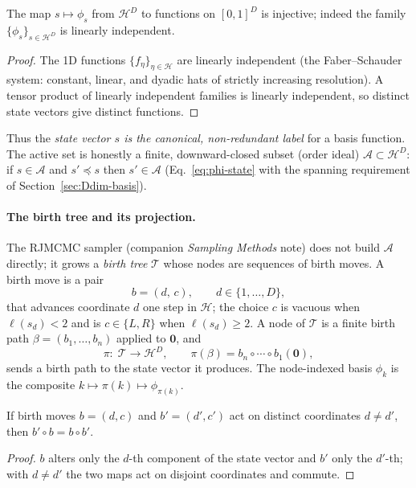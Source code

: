 \documentclass[11pt]{article}
\begin{document}
\begin{proposition}
\label{prop:phi-injective}
The map $s\mapsto\phi_s$ from $\mathcal{H}^D$ to functions on $[0,1]^D$ is
injective; indeed the family $\{\phi_s\}_{s\in\mathcal{H}^D}$ is linearly
independent.
\end{proposition}
\begin{proof}
The 1D functions $\{f_\eta\}_{\eta\in\mathcal{H}}$ are linearly independent
(the Faber--Schauder system: constant, linear, and dyadic hats of strictly
increasing resolution).  A tensor product of linearly independent families is
linearly independent, so distinct state vectors give distinct functions.
\end{proof}

Thus the \emph{state vector $s$ is the canonical, non-redundant label} for a
basis function.  The active set is honestly a finite, downward-closed subset
(order ideal) $\mathcal{A}\subset\mathcal{H}^D$: if $s\in\mathcal{A}$ and
$s'\preceq s$ then $s'\in\mathcal{A}$ (Eq.~\eqref{eq:phi-state} with the
spanning requirement of Section~\ref{sec:Ddim-basis}).

\paragraph{The birth tree and its projection.}
The RJMCMC sampler (companion \emph{Sampling Methods} note) does not build
$\mathcal{A}$ directly; it grows a \emph{birth tree} $\mathcal{T}$ whose nodes
are sequences
of birth moves.  A birth move is a pair
\begin{equation}
  b = (d,\,c),\qquad d\in\{1,\dots,D\},
\end{equation}
that advances coordinate $d$ one step in $\mathcal{H}$; the choice $c$ is vacuous
when $\ell(s_d)<2$ and is $c\in\{L,R\}$ when $\ell(s_d)\ge2$.  A node of
$\mathcal{T}$ is a finite birth path $\beta=(b_1,\dots,b_n)$ applied to
$\mathbf 0$, and
\begin{equation}
  \pi:\;\mathcal{T}\longrightarrow\mathcal{H}^D,
  \qquad
  \pi(\beta) = b_n\circ\cdots\circ b_1(\mathbf 0),
\end{equation}
sends a birth path to the state vector it produces.  The node-indexed basis
$\phi_k$ is the composite $k\mapsto\pi(k)\mapsto\phi_{\pi(k)}$.

\begin{proposition}
\label{prop:commute}
If birth moves $b=(d,c)$ and $b'=(d',c')$ act on distinct coordinates
$d\ne d'$, then $b'\circ b = b\circ b'$.
\end{proposition}
\begin{proof}
$b$ alters only the $d$-th component of the state vector and $b'$ only the
$d'$-th; with $d\ne d'$ the two maps act on disjoint coordinates and commute.
\end{proof}
\end{document}
